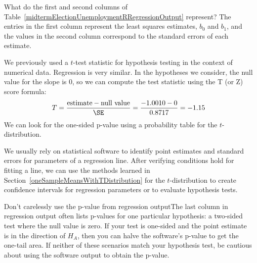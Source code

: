 \begin{example}{What do the first and second columns of Table~\ref{midtermElectionUnemploymentRRegressionOutput} represent?}
The entries in the first column represent the least squares estimates, $b_0$ and $b_1$, and the values in the second column correspond to the standard errors of each estimate.
\end{example}

We previously used a $t$-test statistic for hypothesis testing in the context of numerical data. Regression is very similar. In the hypotheses we consider, the null value for the slope is 0, so we can compute the test statistic using the T (or Z) score formula:
\begin{align*}
T = \frac{\text{estimate} - \text{null value}}{\SE} = \frac{-1.0010 - 0}{0.8717} = -1.15
\end{align*}
We can look for the one-sided p-value
using a probability table for the $t$-distribution.



\begin{termBox}{
We usually rely on statistical software to identify point estimates and standard errors for parameters of a regression line. After verifying conditions hold for fitting a line, we can use the methods learned in Section~\ref{oneSampleMeansWithTDistribution} for the $t$-distribution to create confidence intervals for regression parameters or to evaluate hypothesis tests.}
\end{termBox}

\begin{caution}{Don't carelessly use the p-value from regression output}{The last column in regression output often lists p-values for one particular hypothesis: a two-sided test where the null value is zero. If your test is one-sided and the point estimate is in the direction of $H_A$, then you can halve the software's p-value to get the one-tail area. If neither of these scenarios match your hypothesis test, be cautious about using the software output to obtain the p-value.}
\end{caution}


